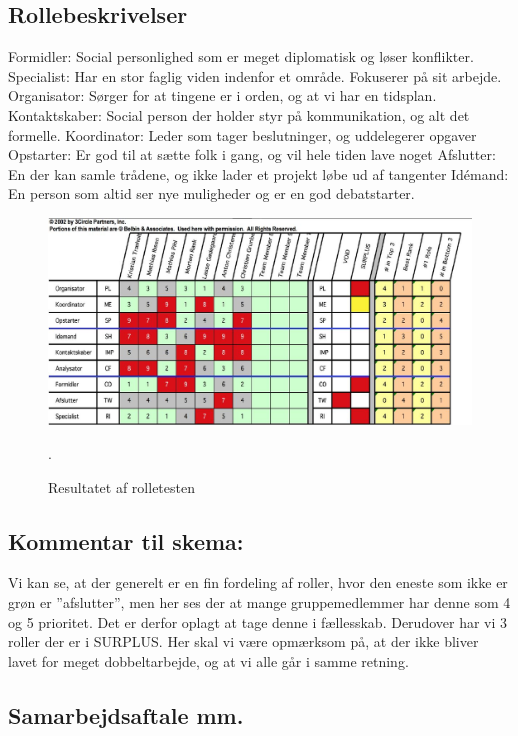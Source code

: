 \documentclass[oneside,a4paper,titlepage]{article}
\begin{document}
\subsection*{Rollebeskrivelser}
Formidler: Social personlighed som er meget diplomatisk og løser konflikter.
Specialist: Har en stor faglig viden indenfor et område. Fokuserer på sit arbejde.
Organisator: Sørger for at tingene er i orden, og at vi har en tidsplan.
Kontaktskaber: Social person der holder styr på kommunikation, og alt det formelle.
Koordinator: Leder som tager beslutninger, og uddelegerer opgaver
Opstarter: Er god til at sætte folk i gang, og vil hele tiden lave noget
Afslutter: En der kan samle trådene, og ikke lader et projekt løbe ud af tangenter
Idémand: En person som altid ser nye muligheder og er en god debatstarter.

\begin{figure}[H]
   \centering
   \includegraphics[width=15cm]{graphics/rolletest}
   \caption{Resultatet af rolletesten}.
\end{figure}

\subsection*{Kommentar til skema:}
Vi kan se, at der generelt er en fin fordeling af roller, hvor den eneste som ikke er grøn er ”afslutter”, men her ses der at mange gruppemedlemmer har denne som 4 og 5 prioritet. Det er derfor oplagt at tage denne i fællesskab. Derudover har vi 3 roller der er i SURPLUS. Her skal vi være opmærksom på, at der ikke bliver lavet for meget dobbeltarbejde, og at vi alle går i samme retning.

\subsection{Samarbejdsaftale mm.}
\label{sec:samarbejdsaftale}
\end{document}
